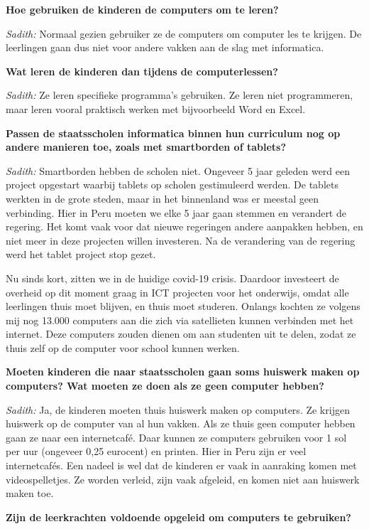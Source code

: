 \textbf{Hoe gebruiken de kinderen de computers om te leren?}

\textit{Sadith:} Normaal gezien gebruiker ze de computers om computer les te krijgen. De leerlingen gaan dus niet voor andere vakken aan de slag met informatica. 

\textbf{Wat leren de kinderen dan tijdens de computerlessen?}

\textit{Sadith:} Ze leren specifieke programma's gebruiken. Ze leren niet programmeren, maar leren vooral praktisch werken met bijvoorbeeld Word en Excel.

\textbf{Passen de staatsscholen informatica binnen hun curriculum nog op andere manieren toe, zoals met smartborden of tablets?}

\textit{Sadith:} Smartborden hebben de scholen niet. Ongeveer 5 jaar geleden werd een project opgestart waarbij tablets op scholen gestimuleerd werden. De tablets werkten in de grote steden, maar in het binnenland was er meestal geen verbinding. Hier in Peru moeten we elke 5 jaar gaan stemmen en verandert de regering. Het komt vaak voor dat nieuwe regeringen andere aanpakken hebben, en niet meer in deze projecten willen investeren. Na de verandering van de regering werd het tablet project stop gezet.

Nu sinds kort, zitten we in de huidige covid-19 crisis. Daardoor investeert de overheid op dit moment graag in ICT projecten voor het onderwijs, omdat alle leerlingen thuis moet blijven, en thuis moet studeren. Onlangs kochten ze volgens mij nog 13.000 computers aan die zich via satellieten kunnen verbinden met het internet. Deze computers zouden dienen om aan studenten uit te delen, zodat ze thuis zelf op de computer voor school kunnen werken. 

\textbf{Moeten kinderen die naar staatsscholen gaan soms huiswerk maken op computers? Wat moeten ze doen als ze geen computer hebben?}

\textit{Sadith:} Ja, de kinderen moeten thuis huiswerk maken op computers. Ze krijgen huiswerk op de computer van al hun vakken. Als ze thuis geen computer hebben gaan ze naar een internetcafé. Daar kunnen ze computers gebruiken voor 1 sol per uur (ongeveer 0,25 eurocent) en printen. Hier in Peru zijn er veel internetcafés. Een nadeel is wel dat de kinderen er vaak in aanraking komen met videospelletjes. Ze worden verleid, zijn vaak afgeleid, en komen niet aan huiswerk maken toe. 

\textbf{Zijn de leerkrachten voldoende opgeleid om computers te gebruiken?}

